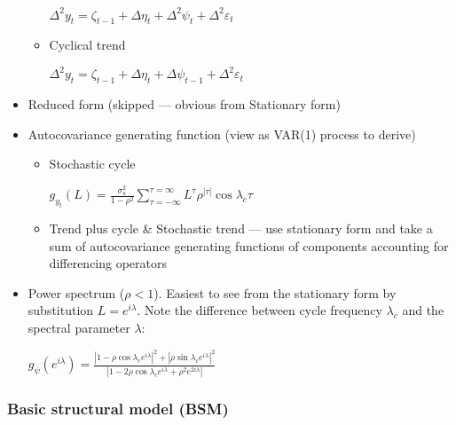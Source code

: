 \documentclass[12pt]{article}
\theoremstyle{definition}
\theoremstyle{remark}
\numberwithin{equation}{section}
\begin{document}
\begin{itemize}
\begin{itemize}
		$\Delta^2 y_t = \zeta_{t-1} + \Delta\eta_t + \Delta^2 \psi_t + \Delta^2\varepsilon_t$

		\item Cyclical trend

		$\Delta^2 y_t = \zeta_{t-1} + \Delta\eta_t + \Delta \psi_{t-1} + \Delta^2\varepsilon_t$

	\end{itemize}

	\item Reduced form (skipped --- obvious from Stationary form)

	\item Autocovariance generating function (view as VAR(1) process to derive)

	\begin{itemize}
		\item Stochastic cycle

		$\displaystyle g_{y_t}(L) = \frac {\sigma^2_\kappa} {1-\rho^2} \sum_{\tau = -\infty}^{\tau = \infty} L^\tau \rho^{|\tau|}\cos\lambda_c\tau$

		\item Trend plus cycle \& Stochastic trend --- use stationary form and take a sum of autocovariance generating functions of components accounting for differencing operators

	\end{itemize}

	\item Power spectrum ($\rho<1$). Easiest to see from the stationary form by substitution $L = e^{i\lambda}$. Note the difference between cycle frequency $\lambda_c$ and the spectral parameter $\lambda$:

	$\displaystyle g_\psi(e^{i\lambda}) = \frac {|1-\rho\cos\lambda_c e^{i\lambda}|^2 + |\rho\sin\lambda_c e^{i\lambda}|^2}{|1-2\rho\cos\lambda_c e^{i\lambda}+ \rho^2e^{2i\lambda}|}$

\end{itemize}
\subsubsection{Basic structural model (BSM)}
\end{document}
